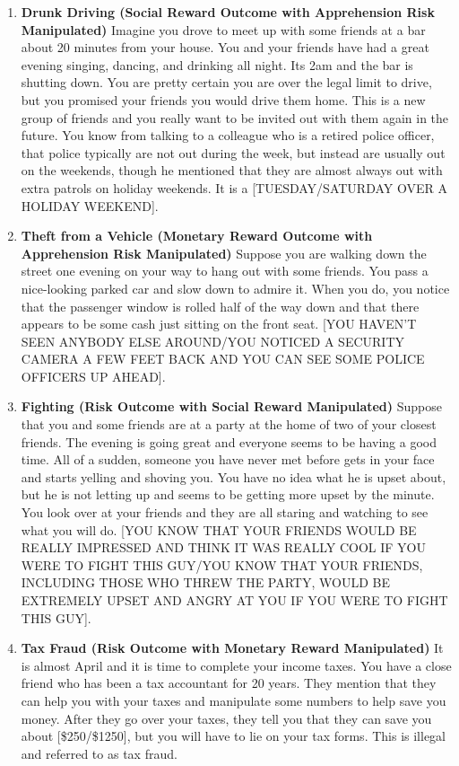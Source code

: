 \documentclass{article} %
\begin{document}
\begin{enumerate}[A]
\item \textbf{Drunk Driving (Social Reward Outcome with Apprehension Risk Manipulated)}
Imagine you drove to meet up with some friends at a bar about 20 minutes from your house. You and your friends have had a great evening singing, dancing, and drinking all night. Its 2am and the bar is shutting down. You are pretty certain you are over the legal limit to drive, but you promised your friends you would drive them home. This is a new group of friends and you really want to be invited out with them again in the future. You know from talking to a colleague who is a retired police officer, that police typically are not out during the week, but instead are usually out on the weekends, though he mentioned that they are almost always out with extra patrols on holiday weekends. It is a [TUESDAY/SATURDAY OVER A HOLIDAY WEEKEND]. 

\item \textbf{Theft from a Vehicle (Monetary Reward Outcome with Apprehension Risk Manipulated)}
Suppose you are walking down the street one evening on your way to hang out with some friends. You pass a nice-looking parked car and slow down to admire it. When you do, you notice that the passenger window is rolled half of the way down and that there appears to be some cash just sitting on the front seat. [YOU HAVEN’T SEEN ANYBODY ELSE AROUND/YOU NOTICED A SECURITY CAMERA A FEW FEET BACK AND YOU CAN SEE SOME POLICE OFFICERS UP AHEAD].

\item \textbf{Fighting (Risk Outcome with Social Reward Manipulated)}
Suppose that you and some friends are at a party at the home of two of your closest friends. The evening is going great and everyone seems to be having a good time. All of a sudden, someone you have never met before gets in your face and starts yelling and shoving you. You have no idea what he is upset about, but he is not letting up and seems to be getting more upset by the minute. You look over at your friends and they are all staring and watching to see what you will do. [YOU KNOW THAT YOUR FRIENDS WOULD BE REALLY IMPRESSED AND THINK IT WAS REALLY COOL IF YOU WERE TO FIGHT THIS GUY/YOU KNOW THAT YOUR FRIENDS, INCLUDING THOSE WHO THREW THE PARTY, WOULD BE EXTREMELY UPSET AND ANGRY AT YOU IF YOU WERE TO FIGHT THIS GUY].


\item \textbf{Tax Fraud (Risk Outcome with Monetary Reward Manipulated)}
It is almost April and it is time to complete your income taxes. You have a close friend who has been a tax accountant for 20 years. They mention that they can help you with your taxes and manipulate some numbers to help save you money. After they go over your taxes, they tell you that they can save you about [\$250/\$1250], but you will have to lie on your tax forms. This is illegal and referred to as tax fraud. 



\end{enumerate}
\end{document}
